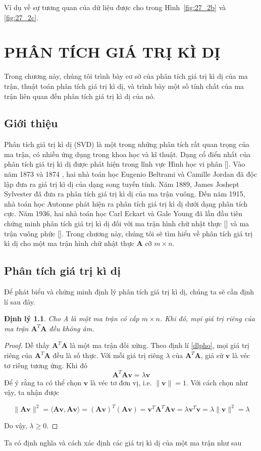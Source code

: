 \documentclass[12pt,a4paper,oneside]{report}
\newtheorem{dl}{Định lý}[section]
\numberwithin{equation}{section}
\begin{document}
Ví dụ về sự tương quan của dữ liệu được cho trong Hình~\ref{fig:27_2b} và
\ref{fig:27_2c}.%
\chapter{ PHÂN TÍCH GIÁ TRỊ KÌ DỊ }

Trong chương này, chúng tôi trình bày cơ sở của phân tích giá trị kì dị của ma trận, thuật toán phân tích giá trị kì dị, và trình bày một số tính chất của ma trận liên quan đến phân tích giá trị kì dị của nó. 
\section{Giới thiệu}
Phân tích giá trị kì dị (SVD) là một trong những phân tích rất quan trọng của ma trận, có nhiều ứng dụng trong khoa học và kĩ thuật. Dạng cổ điển nhất của phân tích giá trị kì dị được phát hiện trong lĩnh vực Hình học vi phân []. Vào năm 1873 và 1874 , hai nhà toán học Eugenio Beltrami và Camille Jordan đã độc lập đưa ra giá trị kì dị của dạng song tuyến tính. Năm 1889, James Joshept Sylvester đã đưa ra phân tích giá trị kì dị của ma trận vuông. Đến năm 1915, nhà toán học Autonne phát hiện ra phân tích giá trị kì dị dưới dạng phân tích cực. Năm 1936, hai nhà toán học Carl Eckart và Gale Young đã lần đầu tiên chứng minh phân tích giá trị kì dị đối với ma trận hình chữ nhật thực [] và ma trận vuông phức []. Trong chương này, chúng tôi sẽ tìm hiểu về phân tích giá trị kì dị cho một ma trận hình chữ nhật thực $\mathbf{A}$ cỡ $m \times n$.
\section{Phân tích giá trị kì dị}
Để phát biểu và chứng minh định lý phân tích giá trị kì dị, chúng ta sẽ cần định lí sau đây.

\begin{dl} \label{dl_1} Cho A là một ma trận có cấp $m \times n$. Khi đó, mọi giá trị riêng của ma trận $\mathbf{A}^{T} \mathbf{A}$ đều không âm.
\end{dl}
\begin{proof}
Dễ thấy $\mathbf{A}^{T} \mathbf{A}$ là một ma trận đối xứng. Theo định lí \ref{dlpho}, mọi giá trị riêng của $\mathbf{A}^{T} \mathbf{A}$ đều là số thực. Với mỗi giá trị riêng $\lambda$ của $\mathbf{A}^{T} \mathbf{A}$, giả sử $\mathbf{v}$ là véc tơ riêng tương ứng. Khi đó
\begin{equation} \label{eq1}
\mathbf{A}^{T} \mathbf{A} \mathbf{v}=\lambda \mathbf{v}
\end{equation}
Để ý rằng ta có thể chọn $\mathbf{v}$ là véc tơ đơn vị, i.e. $\|\mathbf{v}\|=1$. Với cách chọn như vậy, ta nhận được

\begin{equation} \label{eq2}
\|\mathbf{A} \mathbf{v}\|^{2}=\langle\mathbf{A} \mathbf{v}, \mathbf{A v}\rangle=(\mathbf{A v})^{T}(\mathbf{A v})=\mathbf{v}^{T} \mathbf{A}^{T} \mathbf{A} \mathbf{v}=\lambda \mathbf{v}^{T} \mathbf{v}=\lambda\|\mathbf{v}\|^{2}=\lambda
\end{equation}

Do vậy, $\lambda \geqslant 0$.
\end{proof}
Ta có định nghĩa và cách xác định các giá trị kì dị của một ma trận như sau
\end{document}
